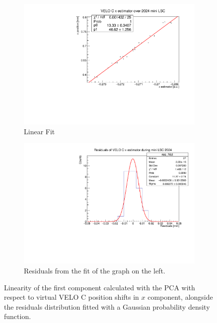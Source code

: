 \begin{figure}
    \centering
    \begin{subfigure}{0.48\textwidth}
    \includegraphics[width=\linewidth]{figures/x_fit_VELO_C_data.pdf}
    \caption{Linear Fit}\label{fig:x_veloC_fit_data}
    \end{subfigure}
    \begin{subfigure}{0.48\textwidth}
    \includegraphics[width=\linewidth]{figures/x_res_VELO_C_data.pdf}
    \caption{Residuals from the fit of the graph on the left. }\label{fig:x_veloC_res_data}
    \end{subfigure}
    \caption{Linearity of the first component calculated with the PCA with respect to  virtual VELO C position shifts in $x$ component, alongside the residuals distribution fitted with a Gaussian probability density function.}
    \label{fig:x_veloC_data}
\end{figure}
